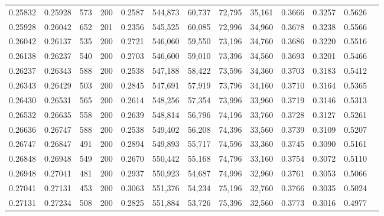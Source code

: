 \begin{tabular}{rrrrrrrrrrrrr}
0.25832 & 0.25928 &   573 & 200 &                                     0.2587 & 544,873 &  60,737 &  72,795 &  35,161 & 0.3666 & 0.3257 & 0.5626 \\
0.25928 & 0.26042 &   652 & 201 &                                     0.2356 & 545,525 &  60,085 &  72,996 &  34,960 & 0.3678 & 0.3238 & 0.5566 \\
0.26042 & 0.26137 &   535 & 200 &                                     0.2721 & 546,060 &  59,550 &  73,196 &  34,760 & 0.3686 & 0.3220 & 0.5516 \\
0.26138 & 0.26237 &   540 & 200 &                                     0.2703 & 546,600 &  59,010 &  73,396 &  34,560 & 0.3693 & 0.3201 & 0.5466 \\
0.26237 & 0.26343 &   588 & 200 &                                     0.2538 & 547,188 &  58,422 &  73,596 &  34,360 & 0.3703 & 0.3183 & 0.5412 \\
0.26343 & 0.26429 &   503 & 200 &                                     0.2845 & 547,691 &  57,919 &  73,796 &  34,160 & 0.3710 & 0.3164 & 0.5365 \\
0.26430 & 0.26531 &   565 & 200 &                                     0.2614 & 548,256 &  57,354 &  73,996 &  33,960 & 0.3719 & 0.3146 & 0.5313 \\
0.26532 & 0.26635 &   558 & 200 &                                     0.2639 & 548,814 &  56,796 &  74,196 &  33,760 & 0.3728 & 0.3127 & 0.5261 \\
0.26636 & 0.26747 &   588 & 200 &                                     0.2538 & 549,402 &  56,208 &  74,396 &  33,560 & 0.3739 & 0.3109 & 0.5207 \\
0.26747 & 0.26847 &   491 & 200 &                                     0.2894 & 549,893 &  55,717 &  74,596 &  33,360 & 0.3745 & 0.3090 & 0.5161 \\
0.26848 & 0.26948 &   549 & 200 &                                     0.2670 & 550,442 &  55,168 &  74,796 &  33,160 & 0.3754 & 0.3072 & 0.5110 \\
0.26948 & 0.27041 &   481 & 200 &                                     0.2937 & 550,923 &  54,687 &  74,996 &  32,960 & 0.3761 & 0.3053 & 0.5066 \\
0.27041 & 0.27131 &   453 & 200 &                                     0.3063 & 551,376 &  54,234 &  75,196 &  32,760 & 0.3766 & 0.3035 & 0.5024 \\
0.27131 & 0.27234 &   508 & 200 &                                     0.2825 & 551,884 &  53,726 &  75,396 &  32,560 & 0.3773 & 0.3016 & 0.4977 \\

\end{tabular}
